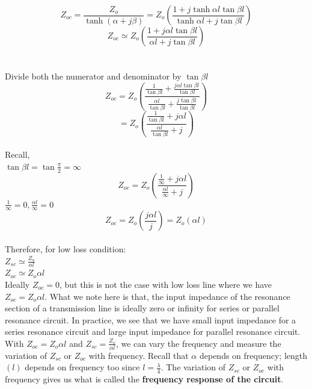 \begin{equation}
Z_{oc} = \frac{Z_{o}}{\tanh(\alpha+j\beta)}=Z_{o}\left(\frac{1+j\tanh \alpha l\tan \beta l}{\tanh \alpha l+j\tan \beta l}\right)
\end{equation}
\begin{equation}
Z_{oc} \simeq Z_{o}\left(\frac{1+ j \alpha l\tan \beta l}{\alpha l+j\tan \beta l}\right)
\end{equation}\\\\
Divide both the numerator and denominator by $ \tan \beta l $
\begin{equation}
Z_{oc}=Z_{o}\left(\frac{\frac{1}{\tan \beta l}+\frac{j \alpha l\tan \beta l}{\tan \beta l}}{\frac{\alpha l}{\tan \beta l}+\frac{j\tan \beta l}{\tan \beta l}}\right)
\end{equation}
\begin{equation}
=Z_{o}\left(\frac{\frac{1}{\tan \beta l} + j \alpha l}{\frac{\alpha l}{\tan \beta l} + j}\right)
\end{equation}\\
Recall,\\
$ \tan\beta l =\tan\frac{\pi}{2}=\infty $\\
\begin{equation}
Z_{oc}=Z_{o}\left(\frac{\frac{1}{\infty} + j \alpha l}{\frac{\alpha l}{\infty} + j}\right)
\end{equation}
$ \frac{1}{\infty}=0, \frac{\alpha l}{\infty}=0 $\\
\begin{equation}
\boxed{	Z_{oc}=Z_{o}\left(\frac{j \alpha l}{j}\right)=Z_{o}(\alpha l)}\end{equation}\\
Therefore, for low loss condition:\\
$ Z_{sc}\simeq \frac{Z_{o}}{\alpha l} $\\
$ Z_{oc} \simeq Z_{o} \alpha l $\\ 

Ideally $ Z_{oc}=0 $, but this is not the case with low loss line where we have  $ Z_{oc} = Z_{o} \alpha l $. What we note here is that, the input impedance of the resonance section of a transmission line is ideally zero or infinity for series or parallel resonance circuit. In practice, we see that we have small input impedance for a series resonance circuit and large input impedance for parallel resonance circuit.\\

With $ Z_{oc} =  Z_{o} \alpha l $ and  
$ Z_{sc}= \frac{Z_{o}}{\alpha l} $, we can vary the frequency and measure the variation of $ Z_{sc} $ or $ Z_{oc} $ with frequency. Recall that $ \alpha $ depends on frequency; length $(l)$ depends on frequency too since  $ l=\frac{\lambda}{4} $. The variation of $ Z_{sc} $  or  $ Z_{oc} $ with frequency gives us what is called the \textbf{frequency response of the circuit}.\\


